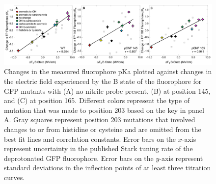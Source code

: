 \begin{figure}
    \center
    \includegraphics[width=6.0in]{figures-gfp-pKa/pKa_vs_elec_stark.png}
    \caption{Changes in the measured fluorophore pKa plotted against changes in the electric field experienced by the B state of the fluorophore for GFP mutants with (A) no nitrile probe present, (B) \pCNF{} at position 145, and (C) \pCNF{} at position 165. Different colors represent the type of mutation that was made to position 203 based on the key in panel A. Gray squares represent position 203 mutations that involved changes to or from histidine or cysteine and are omitted from the best fit lines and correlation constants. Error bars on the $x$-axis represent uncertainty in the published Stark tuning rate of the deprotonated GFP fluorophore. Error bars on the $y$-axis represent standard deviations in the inflection points of at least three \pKa{} titration curves.}
    \label{fig:pKa_vs_stark}
\end{figure}

